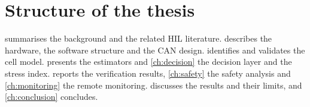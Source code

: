 \section{Structure of the thesis}
 summarises the background and the related HIL literature.  describes the hardware, the software structure and the CAN design.  identifies and validates the cell model.  presents the estimators and \cref{ch:decision} the decision layer and the stress index.  reports the verification results, \cref{ch:safety} the safety analysis and \cref{ch:monitoring} the remote monitoring.  discusses the results and their limits, and \cref{ch:conclusion} concludes.
